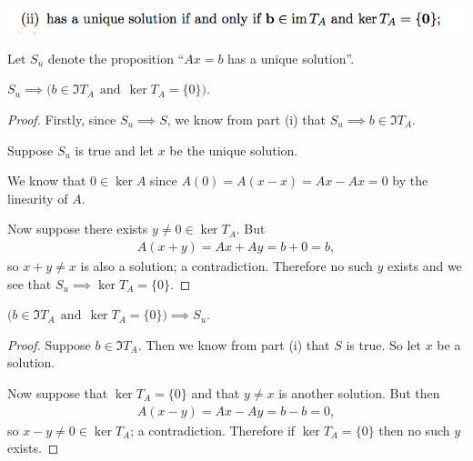 \documentclass[12pt]{article}
\begin{document}



\subsubsection*{} %
\begin{mdframed}
\includegraphics[width=400pt]{img/oxford-prelims-2017-A-2-1-2.png}
\end{mdframed}

Let $S_u$ denote the proposition ``$Ax = b$ has a unique solution''.

\begin{claim*}
  $S_u \implies \Big(b \in \Im T_A ~~\text{and}~~ \ker T_A = \{0\}\Big)$.
\end{claim*}

\begin{proof}
Firstly, since $S_u \implies S$, we know from part (i) that
$S_u \implies b \in \Im T_A$.

Suppose $S_u$ is true and let $x$ be the unique solution.

We know that $0 \in \ker A$ since $A(0) = A(x - x) = Ax - Ax = 0$ by the
linearity of $A$.

Now suppose there exists $y \neq 0 \in \ker T_A$. But
\begin{align*}
A(x + y) = Ax + Ay = b + 0 = b,
\end{align*}
so $x + y \neq x$ is also a solution; a contradiction. Therefore no such $y$
exists and we see that $S_u \implies \ker T_A = \{0\}$.
\end{proof}

\begin{claim*}
  $\Big(b \in \Im T_A ~~\text{and}~~ \ker T_A = \{0\}\Big) \implies S_u$.
\end{claim*}

\begin{proof}
  Suppose $b \in \Im T_A$. Then we know from part (i) that $S$ is true. So let
  $x$ be a solution.

Now suppose that $\ker T_A = \{0\}$ and that $y \neq x$ is another solution. But then
\begin{align*}
  A(x - y) = Ax - Ay = b - b = 0,
\end{align*}
so $x - y \neq 0 \in \ker T_A$; a contradiction. Therefore if $\ker T_A = \{0\}$
then no such $y$ exists.
\end{proof}
\end{document}
